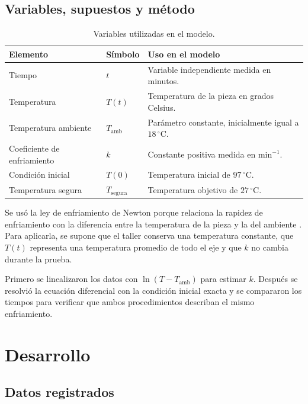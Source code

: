 \documentclass[11pt,onecolumn,letterpaper]{article}
\newcommand{\Tamb}{T_{\mathrm{amb}}}
\newcommand{\Tsegura}{T_{\mathrm{segura}}}
\begin{document}
\subsection{Variables, supuestos y método}

\begin{table}[H]
    \centering
    \caption{Variables utilizadas en el modelo.}
    \begin{tabular}{@{}p{}p{}p{}@{}}
        \toprule
        Elemento & Símbolo & Uso en el modelo \\
        \midrule
        Tiempo & \(t\) & Variable independiente medida en minutos. \\
        Temperatura & \(T(t)\) & Temperatura de la pieza en grados Celsius. \\
        Temperatura ambiente & \(\Tamb\) & Parámetro constante, inicialmente igual a \(18\,^{\circ}\mathrm{C}\). \\
        Coeficiente de enfriamiento & \(k\) & Constante positiva medida en \(\mathrm{min}^{-1}\). \\
        Condición inicial & \(T(0)\) & Temperatura inicial de \(97\,^{\circ}\mathrm{C}\). \\
        Temperatura segura & \(\Tsegura\) & Temperatura objetivo de \(27\,^{\circ}\mathrm{C}\). \\
        \bottomrule
    \end{tabular}
\end{table}

Se usó la ley de enfriamiento de Newton porque relaciona la rapidez de enfriamiento con la diferencia entre la temperatura de la pieza y la del ambiente \citep{incropera2017}. Para aplicarla, se supone que el taller conserva una temperatura constante, que \(T(t)\) representa una temperatura promedio de todo el eje y que \(k\) no cambia durante la prueba.

Primero se linealizaron los datos con \(\ln(T-\Tamb)\) para estimar \(k\). Después se resolvió la ecuación diferencial con la condición inicial exacta y se compararon los tiempos para verificar que ambos procedimientos describan el mismo enfriamiento.

\section{Desarrollo}

\subsection{Datos registrados}
\end{document}
